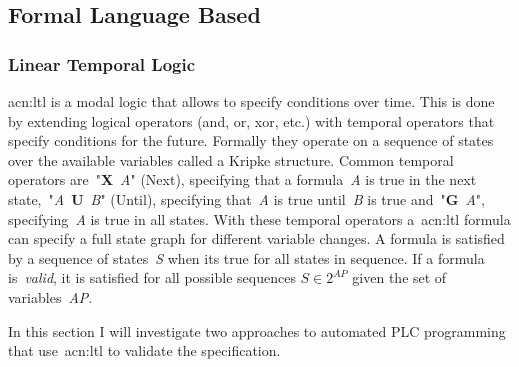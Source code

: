 \subsection{Formal Language Based}
\label{sec:sub:flb}


\subsubsection{Linear Temporal Logic}

\acrfull{acn:ltl} is a modal logic that allows to specify conditions over time.
This is done by extending logical operators (and, or, xor, etc.) with temporal operators that specify conditions for the future.
Formally they operate on a sequence of states over the available variables called a Kripke structure.
Common temporal operators are~"\textbf{X}~\textit{A}" (Next), specifying that a formula~\textit{A} is true in the next state,~"\textit{A}~\textbf{U}~\textit{B}" (Until), specifying that~\textit{A} is true until~\textit{B} is true and~"\textbf{G}~\textit{A}", specifying~\textit{A} is true in all states.
With these temporal operators a~\acrfull{acn:ltl} formula can specify a full state graph for different variable changes.
A formula is satisfied by a sequence of states~\textit{S} when its true for all states in sequence.
If a formula is~\textit{valid}, it is satisfied for all possible sequences $ S\in 2^{AP} $ given the set of variables~\textit{AP}.

In this section I will investigate two approaches to automated PLC programming that use~\acrshort{acn:ltl} to validate the specification.

